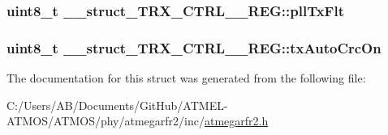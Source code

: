 \hypertarget{struct____struct___t_r_x___c_t_r_l__1___r_e_g_a2472727d56c78ed2e58d7ee34224d9f9}{
\subsubsection[{pll\-Tx\-Flt}]{\setlength{\rightskip}{0pt plus 5cm}uint8\-\_\-t \-\_\-\-\_\-struct\-\_\-\-T\-R\-X\-\_\-\-C\-T\-R\-L\-\_\-\_\-\-R\-E\-G\-::pll\-Tx\-Flt}}\label{struct____struct___t_r_x___c_t_r_l__1___r_e_g_a2472727d56c78ed2e58d7ee34224d9f9}
\hypertarget{struct____struct___t_r_x___c_t_r_l__1___r_e_g_a1c9bd919f3287cc68ce143c761f93191}{
\subsubsection[{tx\-Auto\-Crc\-On}]{\setlength{\rightskip}{0pt plus 5cm}uint8\-\_\-t \-\_\-\-\_\-struct\-\_\-\-T\-R\-X\-\_\-\-C\-T\-R\-L\-\_\-\_\-\-R\-E\-G\-::tx\-Auto\-Crc\-On}}\label{struct____struct___t_r_x___c_t_r_l__1___r_e_g_a1c9bd919f3287cc68ce143c761f93191}


The documentation for this struct was generated from the following file\-:\begin{DoxyCompactItemize}
\item 
C\-:/\-Users/\-A\-B/\-Documents/\-Git\-Hub/\-A\-T\-M\-E\-L-\/\-A\-T\-M\-O\-S/\-A\-T\-M\-O\-S/phy/atmegarfr2/inc/\hyperlink{atmegarfr2_8h}{atmegarfr2.\-h}\end{DoxyCompactItemize}
